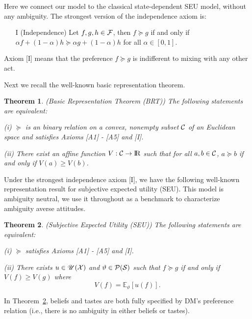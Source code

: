 \documentclass[11pt,oneside]{article}
\theoremstyle{plain}
\theoremstyle{plain}
\theoremstyle{plain}
\newtheorem{thm}{Theorem}[section]
\theoremstyle{plain}
\theoremstyle{plain}
\theoremstyle{definition}
\theoremstyle{definition}
\theoremstyle{remark}
\theoremstyle{plain}
\newcommand{\R}{{\rm I\!R}}
\def\bbe{{\mathbb{E}}}
\newcommand{\calps}{{\cal P}({\cal S})}
\begin{document}
Here we connect our model to the classical state-dependent SEU model, without any ambiguity.
The strongest version of the independence axiom is:
%
\begin{itemize}
\item[I] (Independence) Let $f, g, h \in {\cal F}$, then $f \succeq g$ if and only if $\alpha f + (1 - \alpha) h \succeq \alpha g + (1 - \alpha) h$ for all $\alpha \in [0, 1]$.
\end{itemize}
Axiom [I] means that the preference $f \succeq g$ is indifferent to mixing with any other act.

Next we recall the well-known basic representation theorem.

%
\begin{thm}
\label{thm:BRT}(Basic Representation Theorem (BRT))
The following statements are equivalent:

(i) $\succeq$ is an binary relation on a convex, nonempty subset ${\cal C}$ of an Euclidean space and satisfies Axioms [A1] - [A5] and [I].

(ii) There exist an affine function $V : {\cal C} \rightarrow \R$ such that for all $a,b \in {\cal C}$, $a \succeq b$ if and only if $V(a) \geq V(b)$.
\end{thm}

Under the strongest independence axiom [I], we have the following well-known representation result for subjective expected utility (SEU).
This model is ambiguity neutral, we use it throughout as a benchmark to characterize ambiguity averse attitudes.
%
\begin{thm}
\label{thm:SEU}
(Subjective Expected Utility (SEU))
The following statements are equivalent:

(i) $\succeq$ satisfies Axioms [A1] - [A5] and [I].

(ii) There exists $u \in \mathscr{U}({\cal X})$ and $\vartheta \in \calps$ such that $f \succeq g$ if and only if $V(f) \geq V(g)$ where
%
\begin{equation}
\label{eq:SEU}
V(f) = \bbe_{\vartheta}[u(f)].
\end{equation}
%
\end{thm}
\noindent
In Theorem~\ref{thm:SEU}, beliefs and tastes are both fully specified by DM's preference relation (i.e., there is no ambiguity in either beliefs or tastes).
\end{document}
